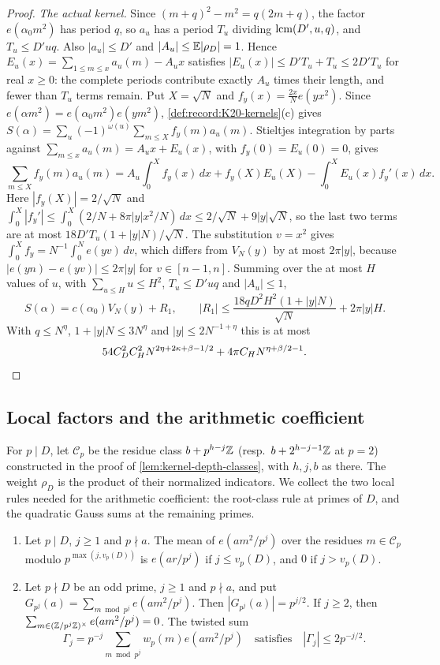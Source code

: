 \begin{proof}
\emph{The actual kernel.} Since $(m+q)^2-m^2=q(2m+q)$, the factor
$e(\alpha_0m^2)$ has period $q$, so $a_u$ has a period $T_u$ dividing
$\operatorname{lcm}(D',u,q)$, and $T_u\le D'uq$. Also $|a_u|\le D'$ and
$|A_u|\le\mathbb E|\rho_D|=1$. Hence $E_u(x)=\sum_{1\le m\le x}a_u(m)-A_ux$
satisfies $|E_u(x)|\le D'T_u+T_u\le2D'T_u$ for real $x\ge0$: the complete
periods contribute exactly $A_u$ times their length, and fewer than $T_u$
terms remain. Put $X=\sqrt N$ and $f_y(x)=\frac{2x}Ne(yx^2)$. Since
$e(\alpha m^2)=e(\alpha_0m^2)e(ym^2)$, \cref{def:record:K20-kernels}(c) gives
$S(\alpha)=\sum_u(-1)^{\omega(u)}\sum_{m\le X}f_y(m)a_u(m)$. Stieltjes
integration by parts against $\sum_{m\le x}a_u(m)=A_ux+E_u(x)$, with
$f_y(0)=E_u(0)=0$, gives
\[
 \sum_{m\le X}f_y(m)a_u(m)=A_u\int_0^Xf_y(x)\,dx+f_y(X)E_u(X)
 -\int_0^XE_u(x)f_y'(x)\,dx .
\]
Here $|f_y(X)|=2/\sqrt N$ and
$\int_0^X|f_y'|\le\int_0^X(2/N+8\pi|y|x^2/N)\,dx\le2/\sqrt N+9|y|\sqrt N$, so
the last two terms are at most $18D'T_u(1+|y|N)/\sqrt N$. The substitution
$v=x^2$ gives $\int_0^Xf_y=N^{-1}\int_0^Ne(yv)\,dv$, which differs from
$V_N(y)$ by at most $2\pi|y|$, because $|e(yn)-e(yv)|\le2\pi|y|$ for
$v\in[n-1,n]$. Summing over the at most $H$ values of $u$, with
$\sum_{u\le H}u\le H^2$, $T_u\le D'uq$ and $|A_u|\le1$,
\[
 S(\alpha)=c(\alpha_0)V_N(y)+R_1,\qquad
 |R_1|\le\frac{18qD^2H^2(1+|y|N)}{\sqrt N}+2\pi|y|H .
\]
With $q\le N^\eta$, $1+|y|N\le3N^\eta$ and $|y|\le2N^{-1+\eta}$ this is at most
\[
 54C_D^2C_H^2N^{2\eta+2\kappa+\beta-1/2}+4\pi C_HN^{\eta+\beta/2-1}.\qedhere
\]
\end{proof}

\subsection{Local factors and the arithmetic coefficient}

For $p\mid D$, let $\mathcal C_p$ be the residue class $b+p^{h-j}\mathbb Z$ (resp.\ $b+2^{h-j-1}\mathbb Z$ at $p=2$) constructed in the proof of \cref{lem:kernel-depth-classes}, with $h,j,b$ as there. The weight $\rho_D$ is the product of their
normalized indicators. We collect the two local rules needed for the
arithmetic coefficient: the root-class rule at primes of $D$, and the
quadratic Gauss sums at the remaining primes.

\begin{lemma}
\label{lem:record:prime-power-lift}
\begin{enumerate}[label=(\alph*)]
\item Let $p\mid D$, $j\ge1$ and $p\nmid a$. The mean of $e(am^2/p^j)$ over the
 residues $m\in\mathcal C_p$ modulo $p^{\max(j,v_p(D))}$ is $e(ar/p^j)$ if
 $j\le v_p(D)$, and $0$ if $j>v_p(D)$.
\item Let $p\nmid D$ be an odd prime, $j\ge1$ and $p\nmid a$, and put
 $G_{p^j}(a)=\sum_{m\bmod p^j}e(am^2/p^j)$. Then $|G_{p^j}(a)|=p^{j/2}$. If
 $j\ge2$, then $\sum_{m\in(\mathbb Z/p^j\mathbb Z)^\times}e(am^2/p^j)=0$. The twisted sum
 \[
  \Gamma_j=p^{-j}\sum_{m\bmod p^j}w_p(m)e(am^2/p^j)
  \quad\text{satisfies}\quad|\Gamma_j|\le2p^{-j/2}.
 \]
\end{enumerate}
\end{lemma}

